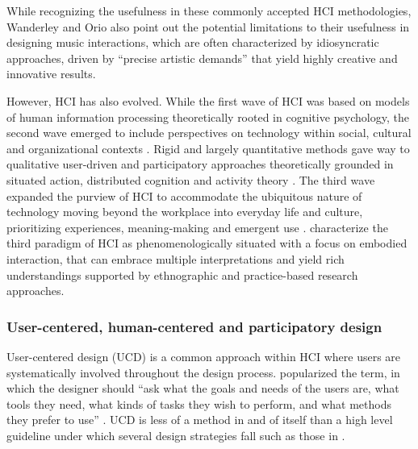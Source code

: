\documentclass[]{interact}
\theoremstyle{plain}%
\theoremstyle{definition}
\theoremstyle{remark}
\begin{document}
While recognizing the usefulness in these commonly accepted HCI methodologies, Wanderley and Orio also point out the potential limitations to their usefulness in designing music interactions, which are often characterized by idiosyncratic approaches, driven by ``precise artistic demands'' \citep*[p. 67]{Wanderley2002} that yield highly creative and innovative results.

However, HCI has also evolved. While the first wave of HCI was based on models of human information processing theoretically rooted in cognitive psychology, the second wave emerged to include perspectives on technology within social, cultural and organizational contexts \citep{kaptelinin2003}. Rigid and largely quantitative methods gave way to qualitative user-driven and participatory approaches theoretically grounded in situated action, distributed cognition and activity theory \citep{Bodker2006}. The third wave expanded the purview of HCI to accommodate the ubiquitous nature of technology moving beyond the workplace into everyday life and culture, prioritizing experiences, meaning-making and emergent use \citep{Bodker2015}. \citet{Harrison2007} characterize the third paradigm of HCI as phenomenologically situated with a focus on embodied interaction, that can embrace multiple interpretations and yield rich understandings supported by ethnographic and practice-based research approaches.

\subsubsection{User-centered, human-centered and participatory design}
\label{ch3-sec:user-centered-design}

User-centered design (UCD) is a common approach within HCI where users are systematically involved throughout the design process. \citet{Norman1988} popularized the term, in which the designer should ``ask what the goals and needs of the users are, what tools they need, what kinds of tasks they wish to perform, and what methods they prefer to use'' \citep[as cited in][p. 44]{El-shimy2014}. UCD is less of a method in and of itself than a high level guideline under which several design strategies fall such as those in \citet{greenberg2011sketching}. 
\end{document}

